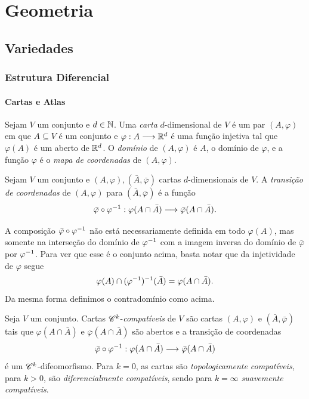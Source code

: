 \part{Geometria}

\chapter{Variedades}

\section{Estrutura Diferencial}

\subsection{Cartas e Atlas}

\begin{defi}
Sejam $V$ um conjunto e $d \in \mathbb{N}$. Uma \emph{carta} $d$-dimensional de $V$ é um par $(A,\varphi)$ em que $A \subseteq V$ é um conjunto e $\varphi: A \longrightarrow \mathbb{R}^d$ é uma função injetiva tal que $\varphi(A)$ é um aberto de $\mathbb{R}^d$. O \emph{domínio} de $(A,\varphi)$ é $A$, o domínio de $\varphi$, e a função $\varphi$ é o \emph{mapa de coordenadas} de $(A,\varphi)$.
\end{defi}

\begin{defi}
Sejam $V$ um conjunto e $(A,\varphi),(\bar A,\bar\varphi)$ cartas $d$-dimensionais de $V$. A \emph{transição de coordenadas} de $(A,\varphi)$ para $(\bar A,\bar\varphi)$ é a função
	\begin{equation*}
	\bar\varphi \circ \varphi^{-1}: \varphi(A \cap \bar A) \longrightarrow \bar\varphi(A \cap \bar A).
	\end{equation*}
\end{defi}

A composição $\bar\varphi \circ \varphi^{-1}$ não está necessariamente definida em todo $\varphi(A)$, mas somente na interseção do domínio de $\varphi^{-1}$ com a imagem inversa do domínio de $\bar\varphi$ por $\varphi^{-1}$. Para ver que esse é o conjunto acima, basta notar que da injetividade de $\varphi$ segue
	\begin{equation*}
	\varphi(A) \cap (\varphi^{-1})^{-1}(\bar A) = \varphi(A \cap \bar A).
	\end{equation*}
Da mesma forma definimos o contradomínio como acima.

\begin{defi}
Seja $V$ um conjunto. Cartas $\mathscr{C}^k$-\emph{compatíveis} de $V$ são cartas $(A,\varphi)$ e $(\bar A,\bar\varphi)$ tais que $\varphi(A \cap \bar A)$ e $\bar\varphi(A \cap \bar A)$ são abertos e a transição de coordenadas
	\begin{equation*}
	\bar\varphi \circ \varphi^{-1}: \varphi(A \cap \bar A) \longrightarrow \bar\varphi(A \cap \bar A)
	\end{equation*}
é um $\mathscr{C}^k$-difeomorfismo. Para $k=0$, as cartas são \emph{topologicamente compatíveis}, para $k>0$, são \emph{diferencialmente compatíveis}, sendo para $k=\infty$ \emph{suavemente compatíveis}.
\end{defi}

